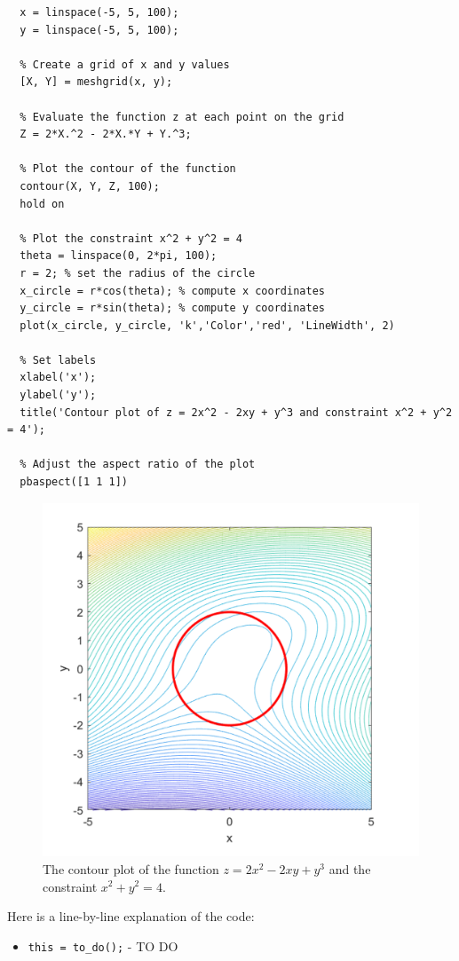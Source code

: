\begin{lstlisting}[style=Matlab-editor]
  % Define the range of values for x and y
  x = linspace(-5, 5, 100);
  y = linspace(-5, 5, 100);
  
  % Create a grid of x and y values
  [X, Y] = meshgrid(x, y);
  
  % Evaluate the function z at each point on the grid
  Z = 2*X.^2 - 2*X.*Y + Y.^3;
  
  % Plot the contour of the function
  contour(X, Y, Z, 100);
  hold on
  
  % Plot the constraint x^2 + y^2 = 4
  theta = linspace(0, 2*pi, 100);
  r = 2; % set the radius of the circle
  x_circle = r*cos(theta); % compute x coordinates
  y_circle = r*sin(theta); % compute y coordinates
  plot(x_circle, y_circle, 'k','Color','red', 'LineWidth', 2)
  
  % Set labels
  xlabel('x');
  ylabel('y');
  title('Contour plot of z = 2x^2 - 2xy + y^3 and constraint x^2 + y^2 = 4');
  
  % Adjust the aspect ratio of the plot
  pbaspect([1 1 1])  
\end{lstlisting}

\begin{figure}[H]
  \centering
  \includegraphics[width=12cm]{graphics/2b.png}
  \caption{The contour plot of the function $z = 2x^2 - 2xy + y^3$ and the constraint $x^2 + y^2 = 4$.}
\end{figure}

\vspace*{1cm}

Here is a line-by-line explanation of the code: \\
\begin{itemize}
  \item \verb!this = to_do();! - TO DO
\end{itemize}

\vspace*{2cm}